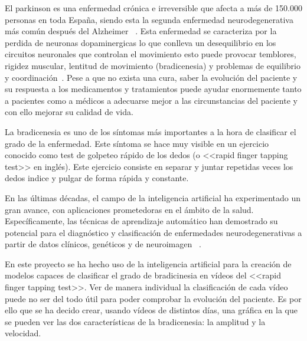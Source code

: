 
El parkinson es una enfermedad crónica e irreversible que afecta a más de 150.000 personas en toda España, siendo esta la segunda enfermedad neurodegenerativa más común después del Alzheimer ~\cite{brainsci11081027}. Esta enfermedad se caracteriza por la perdida de neuronas dopaminergicas lo que conlleva un desequilibrio en los circuitos neuronales que controlan el movimiento esto puede provocar temblores, rigidez muscular, lentitud de movimiento (bradicenesia) y problemas de equilibrio y coordinación~\cite{Poewe_Seppi_Tanner_Halliday_Brundin_Volkmann_Schrag_Lang_2017}.
Pese a que no exista una cura, saber la evolución del paciente y su respuesta a los medicamentos y tratamientos puede ayudar enormemente tanto a pacientes como a médicos a adecuarse mejor a las circunstancias del paciente y con ello mejorar su calidad de vida.
 
La bradicenesia es uno de los síntomas más importantes a la hora de clasificar el grado de la enfermedad. Este síntoma se hace muy visible en un ejercicio conocido como test de golpeteo rápido de los dedos (o <<rapid finger tapping test>> en inglés). Este ejercicio consiste en separar y juntar repetidas veces los dedos indice y pulgar de forma rápida y constante.

En las últimas décadas, el campo de la inteligencia artificial ha experimentado un gran avance, con aplicaciones prometedoras en el ámbito de la salud. Específicamente, las técnicas de aprendizaje automático han demostrado su potencial para el diagnóstico y clasificación de enfermedades neurodegenerativas a partir de datos clínicos, genéticos y de neuroimagen ~\cite{CardiacCare}.

En este proyecto se ha hecho uso de la inteligencia artificial para la creación de modelos capaces de clasificar el grado de bradicinesia en vídeos del <<rapid finger tapping test>>. Ver de manera individual la clasificación de cada vídeo puede no ser del todo útil para poder comprobar la evolución del paciente. Es por ello que se ha decido crear, usando vídeos de distintos días, una gráfica en la que se pueden ver las dos características de la bradicenesia: la amplitud y la velocidad. 